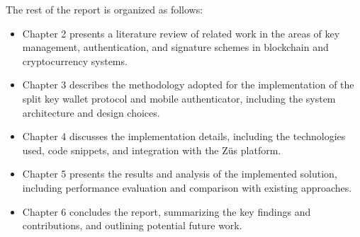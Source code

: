 The rest of the report is organized as follows:
\begin{itemize}
\item Chapter 2 presents a literature review of related work in the areas of key management, authentication, and signature schemes in blockchain and cryptocurrency systems.
\item Chapter 3 describes the methodology adopted for the implementation of the split key wallet protocol and mobile authenticator, including the system architecture and design choices.
\item Chapter 4 discusses the implementation details, including the technologies used, code snippets, and integration with the Züs platform.
\item Chapter 5 presents the results and analysis of the implemented solution, including performance evaluation and comparison with existing approaches.
\item Chapter 6 concludes the report, summarizing the key findings and contributions, and outlining potential future work.
\end{itemize}
